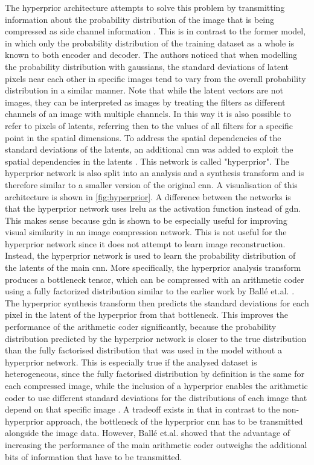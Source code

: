 The hyperprior architecture attempts to solve this problem by transmitting information about the probability distribution of the image that is being compressed as side channel information \citep{balle_variational_2018}. This is in contrast to the former model, in which only the probability distribution of the training dataset as a whole is known to both encoder and decoder. The authors noticed that when modelling the probability distribution with gaussians, the standard deviations of latent pixels near each other in specific images tend to vary from the overall probability distribution in a similar manner. Note that while the latent vectors are not images, they can be interpreted as images by treating the filters as different channels of an image with multiple channels. In this way it is also possible to refer to pixels of latents, referring then to the values of all filters for a specific point in the spatial dimensions. To address the spatial dependencies of the standard deviations of the latents, an additional \ac{cnn} was added to exploit the spatial dependencies in the latents \citep{balle_variational_2018}. This network is called "hyperprior". The hyperprior network is also split into an analysis and a synthesis transform and is therefore similar to a smaller version of the original \ac{cnn}. A visualisation of this architecture is shown in \autoref{fig:hyperprior}. A difference between the networks is that the hyperprior network uses \ac{lrelu} as the activation function instead of \ac{gdn}. This makes sense because \ac{gdn} is shown to be especially useful for improving visual similarity in an image compression network. This is not useful for the hyperprior network since it does not attempt to learn image reconstruction. Instead, the hyperprior network is used to learn the probability distribution of the latents of the main \ac{cnn}. More specifically, the hyperprior analysis transform produces a bottleneck tensor, which can be compressed with an arithmetic coder using a fully factorized distribution similar to the earlier work by Ballé et.al. \citep{balle_end--end_2017}. The hyperprior synthesis transform then predicts the standard deviations for each pixel in the latent of the hyperprior from that bottleneck. This improves the performance of the arithmetic coder significantly, because the probability distribution predicted by the hyperprior network is closer to the true distribution than the fully factorised distribution that was used in the model without a hyperprior network. This is especially true if the analysed dataset is heterogeneous, since the fully factorised distribution by definition is the same for each compressed image, while the inclusion of a hyperprior enables the arithmetic coder to use different standard deviations for the distributions of each image that depend on that specific image \citep{balle_variational_2018}. A tradeoff exists in that in contrast to the non-hyperprior approach, the bottleneck of the hyperprior \ac{cnn} has to be transmitted alongside the image data. However, Ballé et.al. \citep{balle_variational_2018} showed that the advantage of increasing the performance of the main arithmetic coder outweighs the additional bits of information that have to be transmitted.


